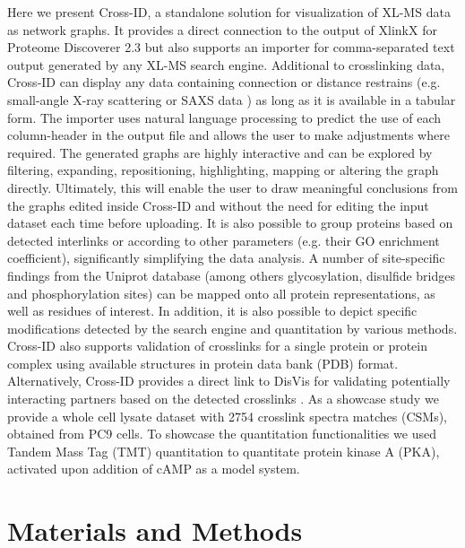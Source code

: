 Here we present Cross-ID, a standalone solution for visualization of XL-MS data as network graphs. It provides a direct connection to the output of XlinkX for Proteome Discoverer 2.3 but also supports an importer for comma-separated text output generated by any XL-MS search engine. Additional to crosslinking data, Cross-ID can display any data containing connection or distance restrains (e.g. small-angle X-ray scattering or SAXS data \cite{morimoto2013small-angle} ) as long as it is available in a tabular form. The importer uses natural language processing to predict the use of each column-header in the output file and allows the user to make adjustments where required. The generated graphs are highly interactive and can be explored by filtering, expanding, repositioning, highlighting, mapping or altering the graph directly. Ultimately, this will enable the user to draw meaningful conclusions from the graphs edited inside Cross-ID and without the need for editing the input dataset each time before uploading. It is also possible to group proteins based on detected interlinks or according to other parameters (e.g. their GO enrichment coefficient), significantly simplifying the data analysis. A number of site-specific findings from the Uniprot database \cite{bateman2017uniprot:} (among others glycosylation, disulfide bridges and phosphorylation sites) can be mapped onto all protein representations, as well as residues of interest. In addition, it is also possible to depict specific modifications detected by the search engine and quantitation by various methods. Cross-ID also supports validation of crosslinks for a single protein or protein complex using available structures in protein data bank (PDB) format. Alternatively, Cross-ID provides a direct link to DisVis for validating potentially interacting partners based on the detected crosslinks \cite{zundert2016disvis, zundert2015disvis:}. As a showcase study we provide a whole cell lysate dataset with 2754 crosslink spectra matches (CSMs), obtained from PC9 cells. To showcase the quantitation functionalities we used Tandem Mass Tag (TMT) quantitation to quantitate protein kinase A (PKA), activated upon addition of cAMP as a model system.


\section{Materials and Methods}

